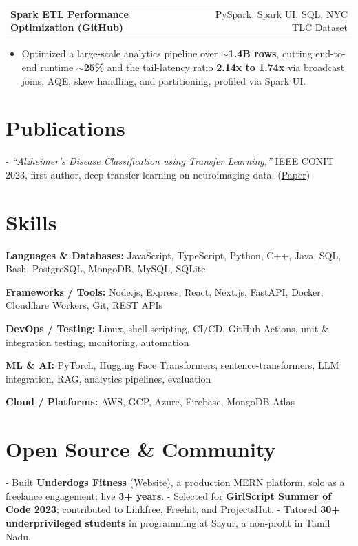 \documentclass[letterpaper,11pt]{article}
\makeatletter
\newcommand{\projItem}[2]{%
  \vspace{2pt}
  \begin{tabular*}{\textwidth}{@{}l@{\extracolsep{\fill}}r@{}}
    \textbf{#1} & #2 \\
  \end{tabular*}\par\vspace{-3pt}
}
\newcommand{\skillLine}[2]{\textbf{#1:} #2\par\vspace{1.5pt}}
\newcommand{\inlineBlock}[1]{{\setlength{\leftskip}{0.18in}\small #1\par}}
\makeatother
\begin{document}
\projItem{Spark ETL Performance Optimization {\normalfont\small(\href{https://github.com/Deva-1903/Spark-ETL-Optimization}{GitHub})}}{PySpark, Spark UI, SQL, NYC TLC Dataset}
\begin{itemize}
  \item Optimized a large-scale analytics pipeline over \textbf{$\sim$1.4B rows}, cutting end-to-end runtime \textbf{$\sim$25\%} and the tail-latency ratio \textbf{2.14x to 1.74x} via broadcast joins, AQE, skew handling, and partitioning, profiled via Spark UI.
\end{itemize}

\section{Publications}
\vspace{2pt}
\inlineBlock{- \textit{``Alzheimer's Disease Classification using Transfer Learning,''} IEEE CONIT 2023, first author, deep transfer learning on neuroimaging data. {\normalfont\small(\href{https://ieeexplore.ieee.org/document/10205760}{Paper})}}

\section{Skills}
\skillLine{Languages \& Databases}{JavaScript, TypeScript, Python, C++, Java, SQL, Bash, PostgreSQL, MongoDB, MySQL, SQLite}
\skillLine{Frameworks / Tools}{Node.js, Express, React, Next.js, FastAPI, Docker, Cloudflare Workers, Git, REST APIs}
\skillLine{DevOps / Testing}{Linux, shell scripting, CI/CD, GitHub Actions, unit \& integration testing, monitoring, automation}
\skillLine{ML \& AI}{PyTorch, Hugging Face Transformers, sentence-transformers, LLM integration, RAG, analytics pipelines, evaluation}
\skillLine{Cloud / Platforms}{AWS, GCP, Azure, Firebase, MongoDB Atlas}

\section{Open Source \& Community}
\inlineBlock{- Built \textbf{Underdogs Fitness} (\href{https://www.underdogsfitness.in/}{Website}), a production MERN platform, solo as a freelance engagement; live \textbf{3+ years}. - Selected for \textbf{GirlScript Summer of Code 2023}; contributed to Linkfree, Freehit, and ProjectsHut. - Tutored \textbf{30+ underprivileged students} in programming at Sayur, a non-profit in Tamil Nadu.}
\end{document}
